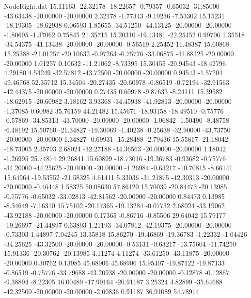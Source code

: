 \begin{filecontents}{NodeRight.dat}
  15.11163  -22.32178  -18.22657    -0.79357   -0.65032  -31.85000  -43.63438  -20.00000  -20.00000    2.32178   -1.77343   -9.19236   -7.53302
  15.15231  -18.19305  -18.62938     0.06593    1.85655  -34.51250  -44.13125  -20.00000  -20.00000   -1.80695   -1.37062    0.75845   21.35715
  15.20310  -19.43481  -22.25452     0.99706    1.35518  -34.54375  -41.13438  -20.00000  -20.00000   -0.56519    2.25452   11.48387   15.60868
  15.25388  -21.01257  -20.10632    -0.97263   -0.75776  -33.06875  -41.88125  -20.00000  -20.00000    1.01257    0.10632  -11.21062   -8.73395
  15.30455  -20.94543  -18.42796     4.29180    4.54249  -32.57812  -43.72500  -20.00000  -20.00000    0.94543   -1.57204   49.46768   52.35712
  15.34504  -20.27435  -20.60978    -0.86519   -0.72194  -32.91563  -42.44375  -20.00000  -20.00000    0.27435    0.60978   -9.87633   -8.24111
  15.39582  -18.62915  -20.60982     3.18162    3.93368  -34.45938  -41.92813  -20.00000  -20.00000   -1.37085    0.60982   35.76159   44.21482
  15.45671  -18.93158  -18.49510    -0.75776   -0.57869  -34.85313  -43.70000  -20.00000  -20.00000   -1.06842   -1.50490   -8.48758   -6.48192
  15.50760  -21.34827  -19.30069    -1.40238   -0.25638  -32.90000  -43.73750  -20.00000  -20.00000    1.34827   -0.69931  -15.28488   -2.79436
  15.55817  -21.18042  -18.73005     2.35793    2.68024  -32.27188  -44.36563  -20.00000  -20.00000    1.18042   -1.26995   25.74874   29.26841
  15.60899  -18.73016  -19.36783    -0.93682   -0.75776  -34.20000  -44.25625  -20.00000  -20.00000   -1.26984   -0.63217  -10.70815   -8.66141
  15.64964  -19.53552  -21.58325     4.61411    5.33036  -34.21875  -42.30313  -20.00000  -20.00000   -0.46448    1.58325   50.08630   57.86120
  15.70039  -20.84473  -20.13985    -0.75776   -0.65032  -33.02813  -42.81562  -20.00000  -20.00000    0.84473    0.13985   -8.34649   -7.16310
  15.75102  -20.17365  -19.13284    -0.07732    2.68024  -33.19062  -43.92188  -20.00000  -20.00000    0.17365   -0.86716   -0.85506   29.64042
  15.79177  -19.26697  -21.44897     0.63893    1.21193  -34.07812  -42.19375  -20.00000  -20.00000   -0.73303    1.44897    7.04245   13.35818
  15.86270  -19.46869  -19.36783    -1.22332   -1.04426  -34.25625  -43.32500  -20.00000  -20.00000   -0.53131   -0.63217  -13.75604  -11.74250
  15.91336  -20.30762  -20.13985     4.11274    4.11274  -33.61250  -43.11875  -20.00000  -20.00000    0.30762    0.13985   45.68906   45.68906
  15.95407  -19.87122  -19.87133    -0.86519   -0.75776  -33.79688  -43.20938  -20.00000  -20.00000   -0.12878   -0.12867   -9.38894   -8.22305
  16.00489  -17.99164  -20.91187     3.25324    4.82899  -35.64688  -42.32500  -20.00000  -20.00000   -2.00836    0.91187   36.91089   54.78914

\end{filecontents}
